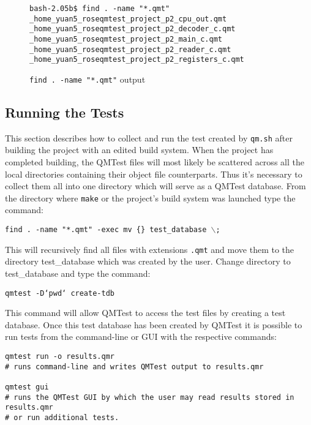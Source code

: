 \begin{figure}[!ht]
{\scriptsize
\begin{verbatim}
bash-2.05b$ find . -name "*.qmt" 
_home_yuan5_roseqmtest_project_p2_cpu_out.qmt
_home_yuan5_roseqmtest_project_p2_decoder_c.qmt
_home_yuan5_roseqmtest_project_p2_main_c.qmt
_home_yuan5_roseqmtest_project_p2_reader_c.qmt
_home_yuan5_roseqmtest_project_p2_registers_c.qmt
\end{verbatim}
}
\caption{{\tt find . -name "*.qmt"} output}
\end{figure}

\subsection{Running the Tests}

This section describes how to collect and run the test created by {\tt qm.sh}
after building the project with an edited build system. When the project has
completed building, the QMTest files will most likely be scattered across all
the local directories containing their object file counterparts. Thus it's
necessary to collect them all into one directory which will serve as a QMTest
database. From the directory where {\tt make} or the project's build system
was launched type the command:
\begin{center}
{\tt find . -name "*.qmt" -exec mv \{\} test\_database $\backslash$; }
\end{center}

This will recursively find all files with extensions {\tt .qmt} and move them
to the directory test\_database which was created by the user. Change directory
to test\_database and type the command:
\begin{center}
{\tt qmtest -D`pwd` create-tdb}
\end{center}
This command will allow QMTest to access the test files by creating a test
database. Once this test database has been created by QMTest it is possible to
run tests from the command-line or GUI with the respective commands:

\begin{verbatim}
qmtest run -o results.qmr 
# runs command-line and writes QMTest output to results.qmr 

qmtest gui 
# runs the QMTest GUI by which the user may read results stored in results.qmr 
# or run additional tests.
\end{verbatim}


